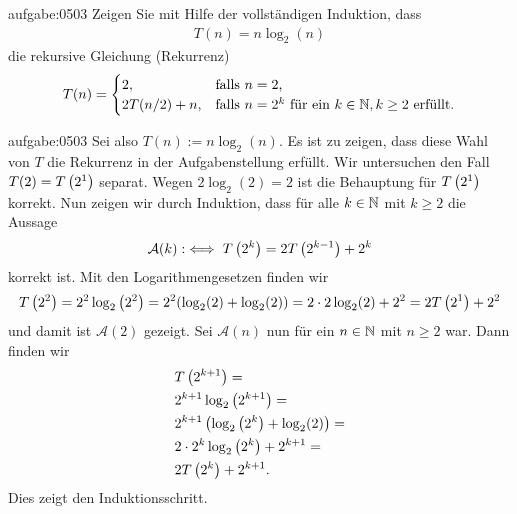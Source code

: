 \begin{aufgabe}{aufgabe:0503}
Zeigen Sie mit Hilfe der vollständigen Induktion, dass
\begin{align*}
    T(n) = n\log_2(n)
\end{align*}
die rekursive Gleichung (Rekurrenz)
\[
  T(n) = 
  \begin{cases}
    2, &\text{falls $n = 2$,} \\
    2T(n/2) + n, & \text{falls $n = 2^k$ für ein $k\in\mathbb{N}, k\geq 2$ erfüllt.}
  \end{cases}
\]
\end{aufgabe}
\begin{antwort}{aufgabe:0503}
Sei also $T(n) := n\log_2(n)$. Es ist zu zeigen, dass diese Wahl von $T$ die Rekurrenz in der Aufgabenstellung erfüllt. Wir untersuchen den Fall $T(2) = T\left(2^1\right)$ separat.
Wegen $2\log_2(2) = 2$ ist die Behauptung für $T\left(2^1\right)$ korrekt. Nun zeigen wir durch Induktion, dass für alle $k\in\mathbb{N}$ mit $k\geq 2$ die Aussage
\begin{align*}
    \mathcal{A}(k) :\iff T\left(2^k\right) = 2T\left(2^{k-1}\right) + 2^k
\end{align*}
korrekt ist. Mit den Logarithmengesetzen finden wir
\begin{align*}
    T\left(2^2\right) = 2^2\log_2\left(2^2\right) = 2^2(\log_2(2) + \log_2(2)) = 2\cdot 2\log_2(2) + 2^2 = 2T\left(2^1\right) + 2^2
\end{align*}
und damit ist $\mathcal{A}(2)$ gezeigt. Sei $\mathcal{A}(n)$ nun für ein $n\in\mathbb{N}$ mit $n\geq 2$ war. Dann finden wir
\begin{align*}
    &T\left(2^{k+1}\right) = \\
    &2^{k+1}\log_2\left(2^{k+1}\right) = \\
    &2^{k+1}\left(\log_2\left(2^{k}\right) + \log_2(2)\right) = \\
    &2\cdot 2^{k}\log_2\left(2^{k}\right) + 2^{k+1} = \\
    &2T\left(2^{k}\right) + 2^{k+1}.
\end{align*}
Dies zeigt den Induktionsschritt.
\end{antwort}

